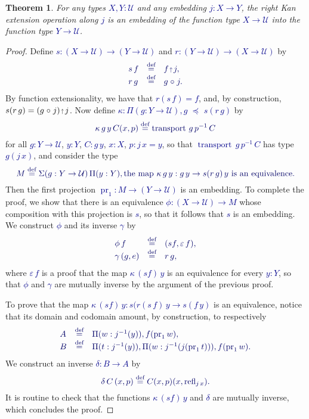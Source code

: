 \documentclass[10pt]{article}
\newcommand{\db}{\textcolor{darkblue}}
\newcommand{\m}[1]{\db{$#1$}}
\newcommand{\M}[1]{\[\db{#1}\]}
\newcommand{\transport}{\operatorname{transport}}
\newcommand{\fst}{\operatorname{pr}_1}
\newcommand{\comp}{\mathrel{\circ}}
\newcommand{\U}{\mathcal{U}}
\newcommand{\refl}{\operatorname{refl}}
\newcommand{\eqdef}{\overset{\text{def}}{=}}
\newcommand{\eup}{\scaleobj{0.7}{\,\uparrow\,}}
\newcommand{\wps}{\mathrel{\,\,\preceq\,\,}}
\newtheorem{theorem}[numbered]{Theorem}
\theoremstyle{definition}
\begin{document}
\begin{theorem}
For any types \m{X,Y:\U} and any embedding \m{j : X \to Y}, the right Kan extension operation along \m{j} is an embedding of the function type \m{X \to \U} into the function type \m{Y \to \U}.
\end{theorem}
\begin{proof}
  Define \m{s : (X \to \U) \to (Y \to \U)} and \m{r : (Y \to \U) \to (X \to \U)} by
  \M{
    \begin{array}{lll}
      s \, f & \eqdef & f \eup j, \\
      r \,  g & \eqdef & g \comp j.
    \end{array}
  }
  By function extensionality, we have that \m{r (s \, f) = f},
  and, by construction, \m{s (r \, g) = (g \comp j) \eup
    j}. Now define \m{\kappa : \Pi (g : Y \to \U), g \wps s(r \,g)
    } by
  \M{
    \kappa \, g \, y \, C (x , p) \eqdef \transport \, g \, p^{-1} \, C
  }
  for all \m{g : Y \to \U}, \m{y : Y}, \m{C : g \, y}, \m{x : X}, \m{p : j \, x = y}, so that
  \m{\transport \, g \, p^{-1} \, C} has type \m{g (j \, x) },
  and consider the type
  \M{
    M \eqdef \Sigma (g : Y \to \U)\,\Pi(y:Y), \text{the map \m{\kappa \, g \, y : g \, y \to s (r \, g) \,y} is an equivalence.}
  }
  Then the first projection \m{\fst : M \to (Y \to \U)} is an embedding.  To complete the proof,
  we show that there is an equivalence \m{\phi : (X \to \U) \to M}
  whose composition with this projection is \m{s}, so that it follows that \m{s}
  is an embedding.  We
  construct \m{\phi} and its inverse \m{\gamma} by
  \M{
    \begin{array}{lll}
      \phi \, f & \eqdef & (s f , \varepsilon \, f), \\
      \gamma \, (g , e) & \eqdef & r \, g,
    \end{array}
  }
  where \m{\varepsilon \, f} is a proof that the map \m{\kappa \, (s
    f) \, y} is an equivalence for every \m{y : Y}, so that \m{\phi}
  and \m{\gamma} are mutually inverse by the argument of the previous
  proof.

  To prove that the map \m{\kappa \, (s f) \, y : s(r(s \,
    f) \, y \to s (f \, y)} is an equivalence, notice that its domain and
  codomain amount, by construction, to respectively
  \M{
    \begin{array}{lll}
      A & \eqdef & \Pi (w : j^{-1}(y)), f(\fst w), \\
      B & \eqdef & \Pi (t : j^{-1}(y)), \Pi (w : j^{-1}(j (\fst t))), f (\fst w).
    \end{array}
  }
  We construct an inverse \m{\delta : B \to A} by
  \M{
    \delta \, C \, (x , p) \eqdef C (x , p) (x , \refl_{j \, x}).
  }
  It is routine to check that the functions \m{\kappa \, (s f) \, y}
  and \m{\delta} are mutually inverse, which concludes the proof.
\end{proof}
\end{document}
